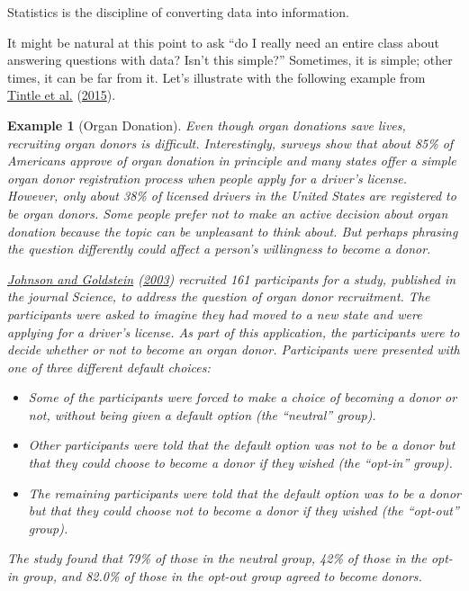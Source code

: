 \documentclass[
]{book}
\providecommand{\tightlist}{%
  \setlength{\itemsep}{0pt}\setlength{\parskip}{0pt}}
\theoremstyle{plain}
\theoremstyle{mydefn}
\theoremstyle{myexmpl}
\newtheorem{example}{Example}[chapter]
\theoremstyle{remark}
\begin{document}
\begin{rmdkeyidea}
Statistics is the discipline of converting data into information.
\end{rmdkeyidea}

It might be natural at this point to ask ``do I really need an entire class about answering questions with data? Isn't this simple?'' Sometimes, it is simple; other times, it can be far from it. Let's illustrate with the following example from \protect\hyperlink{ref-Tintle2015}{Tintle et al.} (\protect\hyperlink{ref-Tintle2015}{2015}).

\begin{example}[Organ Donation]
\protect\hypertarget{exm:basics-organ-donation}{}{\label{exm:basics-organ-donation} {} }Even though organ donations save lives, recruiting organ donors is difficult. Interestingly, surveys show that about 85\% of Americans approve of organ donation in principle and many states offer a simple organ donor registration process when people apply for a driver's license. However, only about 38\% of licensed drivers in the United States are registered to be organ donors. Some people prefer not to make an active decision about organ donation because the topic can be unpleasant to think about. But perhaps phrasing the question differently could affect a person's willingness to become a donor.

\protect\hyperlink{ref-Johnson2003}{Johnson and Goldstein} (\protect\hyperlink{ref-Johnson2003}{2003}) recruited 161 participants for a study, published in the journal \emph{Science}, to address the question of organ donor recruitment. The participants were asked to imagine they had moved to a new state and were applying for a driver's license. As part of this application, the participants were to decide whether or not to become an organ donor. Participants were presented with one of three different default choices:

\begin{itemize}
\tightlist
\item
  Some of the participants were forced to make a choice of becoming a donor or not, without being given a default option (the ``neutral'' group).
\item
  Other participants were told that the default option was not to be a donor but that they could choose to become a donor if they wished (the ``opt-in'' group).
\item
  The remaining participants were told that the default option was to be a donor but that they could choose not to become a donor if they wished (the ``opt-out'' group).
\end{itemize}

The study found that 79\% of those in the neutral group, 42\% of those in the opt-in group, and 82.0\% of those in the opt-out group agreed to become donors.
\end{example}
\end{document}

